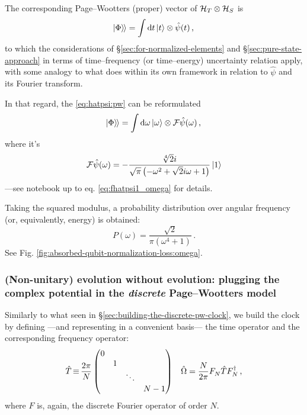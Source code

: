 The corresponding Page--Wootters (proper) vector of $\mathcal{H}_T \otimes \mathcal{H}_S$ is
\begin{equation}\label{eq:hatpsi:pw}
  \hspace{-0.300em}\left.\left| \Phi \right\rangle\hspace{-0.115em}\right\rangle = \int \dd{t} \ket{t} \otimes \hat{\psi}(t) \,\text{,}
\end{equation}
to which the considerations of \S\ref{sec:for-normalized-elements}
and \S\ref{sec:pure-state-approach} in terms of time--frequency
(or time--energy) uncertainty relation apply, with some analogy
to what \cite{RuschhauptAbsorption} does within its own framework
in relation to $\hat{\psi}$ and its Fourier transform.

In that regard, the \eqref{eq:hatpsi:pw} can be reformulated
\begin{equation}
  \hspace{-0.300em}\left.\left| \Phi \right\rangle\hspace{-0.115em}\right\rangle = \int \dd{\omega} \ket{\omega} \otimes \mathcal{F} \hat{\psi} (\omega) \,\text{,}
\end{equation}
where it's
\begin{equation}
  \mathcal{F} \hat{\psi} (\omega) = - \frac{\sqrt[4]{2} i}{\sqrt{\pi} \left(- \omega^{2} + \sqrt{2} i \omega + 1\right)} \ket{1}
\end{equation}
---see notebook up to eq. \eqref{eq:fhatpsi1_omega} for details.

Taking the squared modulus, a probability distribution over angular frequency
(or, equivalently, energy) is obtained:
\[
  P(\omega) = \frac{\sqrt{2}}{\pi \left(\omega^{4} + 1\right)}
  \,\text{.}
\]
See Fig. \ref{fig:absorbed-qubit-normalization-loss:omega}.

\subsubsection{
  (Non-unitary) evolution without evolution:
  plugging the complex potential in the \emph{discrete} Page--Wootters model
}

Similarly to what seen in \S \ref{sec:building-the-discrete-pw-clock}, we build
the clock by defining ---and representing in a convenient basis---
the time operator and the corresponding frequency operator:
\begin{align}
  \hat{T} \operatorname*{\equiv} \frac{2\pi}{N}
  \begin{pmatrix}
    0           &       &       &       \\
                &1      &       &       \\
                &       &\ddots &       \\
                &       &       &N-1
  \end{pmatrix}
  &&
  \hat{\Omega} = \frac{N}{2\pi} F^{}_{N} \hat{T} F^{\dagger}_{N} \, \text{,}
\end{align}
where $F$ is, again, the discrete Fourier operator of order $N$.

